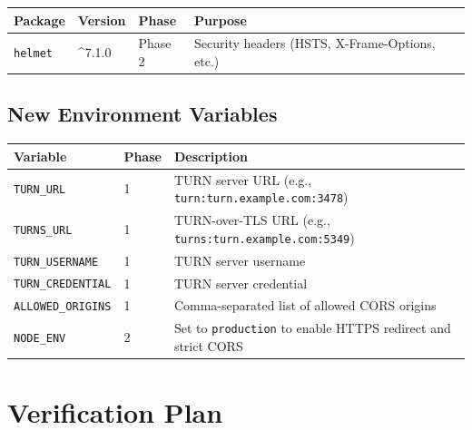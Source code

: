 \documentclass[11pt,letterpaper]{article}
\begin{document}
\begin{center}
\begin{tabular}{llll}
\toprule
\textbf{Package} & \textbf{Version} & \textbf{Phase} & \textbf{Purpose} \\
\midrule
\texttt{helmet} & \^{}7.1.0 & Phase 2 & Security headers (HSTS, X-Frame-Options, etc.) \\
\bottomrule
\end{tabular}
\end{center}

\subsection{New Environment Variables}

\begin{center}
\begin{tabularx}{\textwidth}{L{4cm}C{1cm}L{8cm}}
\toprule
\textbf{Variable} & \textbf{Phase} & \textbf{Description} \\
\midrule
\texttt{TURN\_URL} & 1 & TURN server URL (e.g., \texttt{turn:turn.example.com:3478}) \\
\texttt{TURNS\_URL} & 1 & TURN-over-TLS URL (e.g., \texttt{turns:turn.example.com:5349}) \\
\texttt{TURN\_USERNAME} & 1 & TURN server username \\
\texttt{TURN\_CREDENTIAL} & 1 & TURN server credential \\
\texttt{ALLOWED\_ORIGINS} & 1 & Comma-separated list of allowed CORS origins \\
\texttt{NODE\_ENV} & 2 & Set to \texttt{production} to enable HTTPS redirect and strict CORS \\
\bottomrule
\end{tabularx}
\end{center}

\newpage

\section{Verification Plan}
\end{document}
